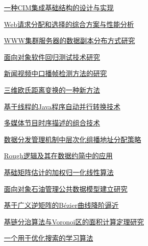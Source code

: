 \documentclass[a4paper]{article}
\begin{document}
\href{http://www.jos.org.cn/ch/reader/download_pdf.aspx?file_no=20010306&year_id=2001&quarter_id=3&falg=1}{一种CIM集成基础结构的设计与实现}

\href{http://www.jos.org.cn/ch/reader/download_pdf.aspx?file_no=20010307&year_id=2001&quarter_id=3&falg=1}{Web请求分配和选择的综合方案与性能分析}

\href{http://www.jos.org.cn/ch/reader/download_pdf.aspx?file_no=20010308&year_id=2001&quarter_id=3&falg=1}{WWW集群服务器的数据副本分布方式研究}

\href{http://www.jos.org.cn/ch/reader/download_pdf.aspx?file_no=20010309&year_id=2001&quarter_id=3&falg=1}{面向对象软件回归测试技术研究}

\href{http://www.jos.org.cn/ch/reader/download_pdf.aspx?file_no=20010310&year_id=2001&quarter_id=3&falg=1}{新闻视频中口播帧检测方法的研究}

\href{http://www.jos.org.cn/ch/reader/download_pdf.aspx?file_no=20010311&year_id=2001&quarter_id=3&falg=1}{三维欧氏距离变换的一种新方法}

\href{http://www.jos.org.cn/ch/reader/download_pdf.aspx?file_no=20010312&year_id=2001&quarter_id=3&falg=1}{基于线程的Java程序自动并行转换技术}

\href{http://www.jos.org.cn/ch/reader/download_pdf.aspx?file_no=20010313&year_id=2001&quarter_id=3&falg=1}{多媒体节目时序描述的组合技术}

\href{http://www.jos.org.cn/ch/reader/download_pdf.aspx?file_no=20010314&year_id=2001&quarter_id=3&falg=1}{数据分发管理机制中层次化组播地址分配策略}

\href{http://www.jos.org.cn/ch/reader/download_pdf.aspx?file_no=20010315&year_id=2001&quarter_id=3&falg=1}{Rough逻辑及其在数据约简中的应用}

\href{http://www.jos.org.cn/ch/reader/download_pdf.aspx?file_no=20010316&year_id=2001&quarter_id=3&falg=1}{基础矩阵估计的加权归一化线性算法}

\href{http://www.jos.org.cn/ch/reader/download_pdf.aspx?file_no=20010317&year_id=2001&quarter_id=3&falg=1}{面向对象石油管理公共数据模型建立研究}

\href{http://www.jos.org.cn/ch/reader/download_pdf.aspx?file_no=20010318&year_id=2001&quarter_id=3&falg=1}{基于广义逆矩阵的Bézier曲线降阶逼近}

\href{http://www.jos.org.cn/ch/reader/download_pdf.aspx?file_no=20010319&year_id=2001&quarter_id=3&falg=1}{基链分治算法与Voronoi区的面积计算定理研究}

\href{http://www.jos.org.cn/ch/reader/download_pdf.aspx?file_no=20010320&year_id=2001&quarter_id=3&falg=1}{一个用于优化搜索的学习算法}
\end{document}
